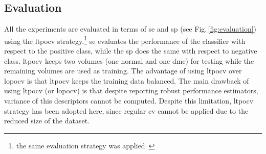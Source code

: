\subsection{Evaluation}\label{sec:evaluation}
All the experiments are evaluated in terms of \gls{se} and \gls{sp} (see
Fig.\,\ref{fig:evaluation}) using the \gls{ltpocv} strategy.\footnote{the same
  evaluation strategy was applied~\cite{Lemaintre2015miccaiOCT}}
\gls{se} evaluates the performance of the classifier with respect to the
positive class, while the \gls{sp} does the same with respect to negative class.
\gls{ltpocv} keeps two volumes (one normal and one \gls{dme}) for testing while
the remaining volumes are used as training. The advantage of using \gls{ltpocv} over \gls{lopocv} is
that \gls{ltpocv} keeps the training data balanced.  
The main drawback of using \gls{ltpocv} (or \gls{lopocv}) is that despite
reporting robust performance estimators, variance of this descriptors cannot be
computed. 
Despite this limitation, \gls{ltpocv} strategy has been adopted here, 
since regular \gls{cv} cannot be applied due to the reduced size of the dataset.

